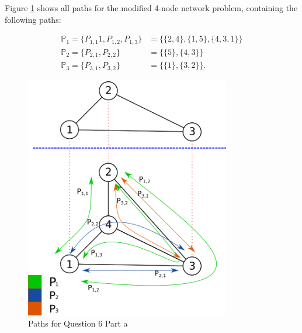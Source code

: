 Figure \ref{fig:images-q6a} shows all paths for the modified 4-node network
problem, containing the following paths:

\begin{align*}
	\mathbb{P}_1 = \{P_{1,1}1,P_{1,2},P_{1,3}\} &= \{\{2,4\},\{1,5\},\{4,3,1\}\} \\
	\mathbb{P}_2 = \{P_{2,1},P_{2,2}\} &= \{\{5\},\{4,3\}\} \\
	\mathbb{P}_3 = \{P_{3,1},P_{3,2}\} &= \{\{1\},\{3,2\}\}
.\end{align*}

\begin{figure}[H]
	\centering
	\includegraphics[width=0.8\textwidth]{images/q6a}
	\caption{Paths for Question 6 Part a}
	\label{fig:images-q6a}
\end{figure}
